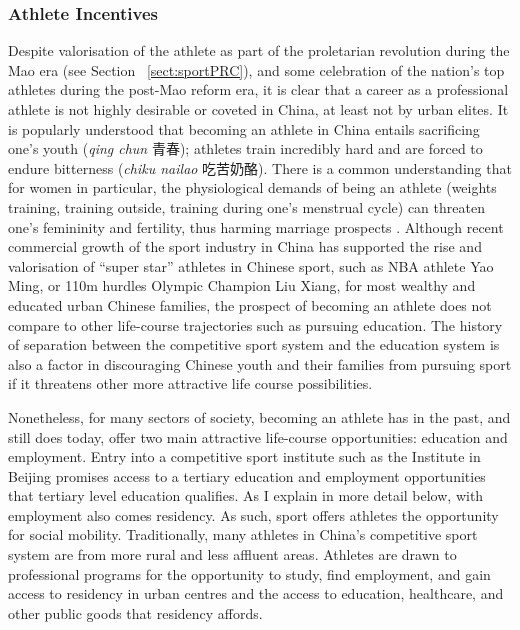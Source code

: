 \begin{CJK}{UTF8}{gbsn}
\subsubsection{Athlete Incentives}

Despite valorisation of the athlete as part of the proletarian revolution during the Mao era (see Section ~\ref{sect:sportPRC}), and some celebration of the nation's top athletes during the post-Mao reform era, it is clear that a career as a professional athlete is not highly desirable or coveted in China, at least not by urban elites.  It is popularly understood that becoming an athlete in China entails sacrificing one's youth (\textit{qing chun} 青春); athletes train incredibly hard and are forced to endure bitterness (\textit{chiku nailao} 吃苦奶酪).  There is a common understanding that for women in particular, the physiological demands of being an athlete (weights training, training outside, training during one's menstrual cycle) can threaten one's femininity and fertility, thus harming marriage prospects \citep{Bronwell1995}.  Although recent commercial growth of the sport industry in China has supported the rise and valorisation of ``super star'' athletes in Chinese sport, such as NBA athlete Yao Ming, or 110m hurdles Olympic Champion Liu Xiang, for most wealthy and educated urban Chinese families, the prospect of becoming an athlete does not compare to other life-course trajectories such as pursuing education.  The history of separation between the competitive sport system and the education system is also a factor in discouraging Chinese youth and their families from pursuing sport if it threatens other more attractive life course possibilities.

Nonetheless, for many sectors of society, becoming an athlete has in the past, and still does today, offer two main attractive life-course opportunities: education and employment. Entry into a competitive sport institute such as the Institute in Beijing promises access to a tertiary education and employment opportunities that tertiary level education qualifies. As I explain in more detail below, with employment also comes residency.  As such, sport offers athletes the opportunity for social mobility.  Traditionally, many athletes in China's competitive sport system are from more rural and less affluent areas.  Athletes are drawn to professional programs for the opportunity to study, find employment, and gain access to residency in urban centres and the access to education, healthcare, and other public goods that residency affords.



\end{CJK}
